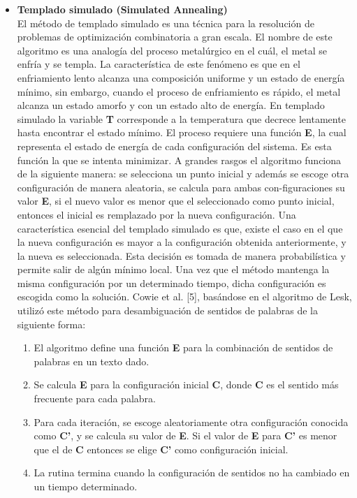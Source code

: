 \begin{itemize}
    \item \textbf{Templado simulado (Simulated Annealing)} \\
    El método de templado simulado es una técnica para la resolución de problemas de optimización combinatoria a gran escala. El nombre de este algoritmo es una analogía del proceso metalúrgico en el cuál, el metal se enfría y se templa. La característica de este fenómeno es que en el enfriamiento lento alcanza una composición uniforme y un estado de energía mínimo, sin embargo, cuando el proceso de enfriamiento es rápido, el metal alcanza un estado amorfo y con un estado alto de energía. En templado simulado la variable \textbf{T} corresponde a la temperatura que decrece lentamente hasta encontrar el estado mínimo.
    El proceso requiere una función \textbf{E}, la cual representa el estado de energía de cada configuración del sistema. Es esta función la que se intenta minimizar. A grandes rasgos el algoritmo funciona de la siguiente manera: se selecciona un punto inicial y además se escoge otra configuración de manera aleatoria, se calcula para ambas con-figuraciones su valor \textbf{E}, si el nuevo valor es menor que el seleccionado como punto inicial, entonces el inicial es remplazado por la nueva configuración. Una característica esencial del templado simulado es que, existe el caso en el que la nueva configuración es mayor a la configuración obtenida anteriormente, y la nueva es seleccionada. Esta decisión es tomada de manera probabilística y permite salir de algún mínimo local. Una vez que el método mantenga la misma configuración por un determinado tiempo, dicha configuración es escogida como la solución.
    Cowie et al. [5], basándose en el algoritmo de Lesk, utilizó este método para desambiguación de sentidos de palabras de la siguiente forma:
    \begin{enumerate}
      \item El algoritmo define una función \textbf{E} para la combinación de sentidos de palabras en un texto dado.
      \item Se calcula \textbf{E} para la configuración inicial \textbf{C}, donde \textbf{C} es el sentido más frecuente para cada palabra.
      \item Para cada iteración, se escoge aleatoriamente otra configuración conocida como \textbf{C’}, y se calcula su valor de \textbf{E}. Si el valor de \textbf{E} para \textbf{C’} es menor que el de \textbf{C} entonces se elige \textbf{C’} como configuración inicial.
      \item  La rutina termina cuando la configuración de sentidos no ha cambiado en un tiempo determinado.
    \end{enumerate}


\end{itemize}
